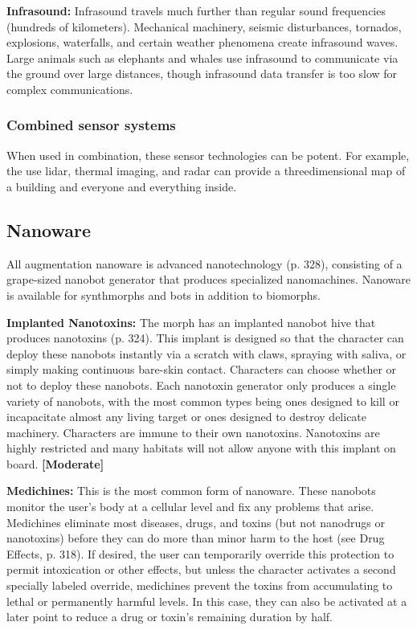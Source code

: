 \textbf{Infrasound:} Infrasound travels much further than regular sound frequencies (hundreds of kilometers). Mechanical machinery, seismic disturbances, tornados, explosions, waterfalls, and certain weather phenomena create infrasound waves. Large animals such as elephants and whales use infrasound to communicate via the ground over large distances, though infrasound data transfer is too slow for complex communications.

\subsubsection{Combined sensor systems}

When used in combination, these sensor technologies can be potent. For example, the use lidar, thermal imaging, and radar can provide a threedimensional map of a building and everyone and everything inside.


\subsection{Nanoware}
\label{sec:nanoware}

All augmentation nanoware is advanced nanotechnology (p. 328), consisting of a grape-sized nanobot generator that produces specialized nanomachines. Nanoware is available for synthmorphs and bots in addition to biomorphs.

\textbf{Implanted Nanotoxins:} The morph has an implanted nanobot hive that produces nanotoxins (p. 324). This implant is designed so that the character can deploy these nanobots instantly via a scratch with claws, spraying with saliva, or simply making continuous bare-skin contact. Characters can choose whether or not to deploy these nanobots. Each nanotoxin generator only produces a single variety of nanobots, with the most common types being ones designed to kill or incapacitate almost any living target or ones designed to destroy delicate machinery. Characters are immune to their own nanotoxins. Nanotoxins are highly restricted and many habitats will not allow anyone with this implant on board. \textbf{[Moderate]}

\textbf{Medichines:} This is the most common form of nanoware. These nanobots monitor the user’s body at a cellular level and fix any problems that arise. Medichines eliminate most diseases, drugs, and toxins (but not nanodrugs or nanotoxins) before they can do more than minor harm to the host (see Drug Effects, p. 318). If desired, the user can temporarily override this protection to permit intoxication or other effects, but unless the character activates a second specially labeled override, medichines prevent the toxins from accumulating to lethal or permanently harmful levels. In this case, they can also be activated at a later point to reduce a drug or toxin’s remaining duration by half.

